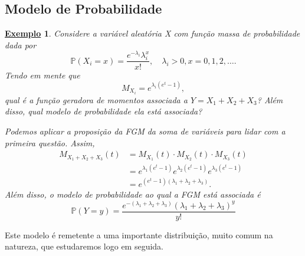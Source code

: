 \documentclass{article}
\newtheorem{example}{\underline{Exemplo}}
\begin{document}
\subsection{Modelo de Probabilidade}
\begin{example}
  Considere a variável aleatória X com função massa de probabilidade dada por 
  \[
    \mathbb{P}(X_{i}=x) = \frac{e^{-\lambda_{i} }\lambda_{i}^{x}}{x!},\quad \lambda_{i} > 0, x = 0, 1, 2, \dotsc.
  \]
  Tendo em mente que 
  \[
    M_{X_{i}} = e^{\lambda_{i} (e^{t}-1)},
  \]
  qual é a função geradora de momentos associada a \(Y = X_{1} + X_{2} + X_{3}\)? Além disso, qual modelo de probabilidade ela está associada?

  Podemos aplicar a proposição da FGM da soma de variáveis para lidar com a primeira questão. Assim,
  \begin{align*}
    M_{X_{1}+X_{2}+X_{3}}(t) &= M_{X_{1}}(t)\cdot M_{X_{2}}(t)\cdot M_{X_{3}}(t)\\
                             &= e^{\lambda_{1}(e^{t}-1)}e^{\lambda_{2}(e^{t}-1)}e^{\lambda_{3}(e^{t}-1)}\\
                             &= e^{(e^{t}-1)(\lambda_{1}+\lambda_{2}+\lambda_{3})}.
  \end{align*}
  Além disso, o modelo de probabilidade ao qual a FGM está associada é 
  \[
    \mathbb{P}(Y=y) = \frac{e^{-(\lambda_{1}+\lambda_{2}+\lambda_{3})}(\lambda_{1}+\lambda_{2}+\lambda_{3})^{y}}{y!}
  \]
\end{example}
Este modelo é remetente a uma importante distribuição, muito comum na natureza, que estudaremos logo em seguida.
\end{document}
